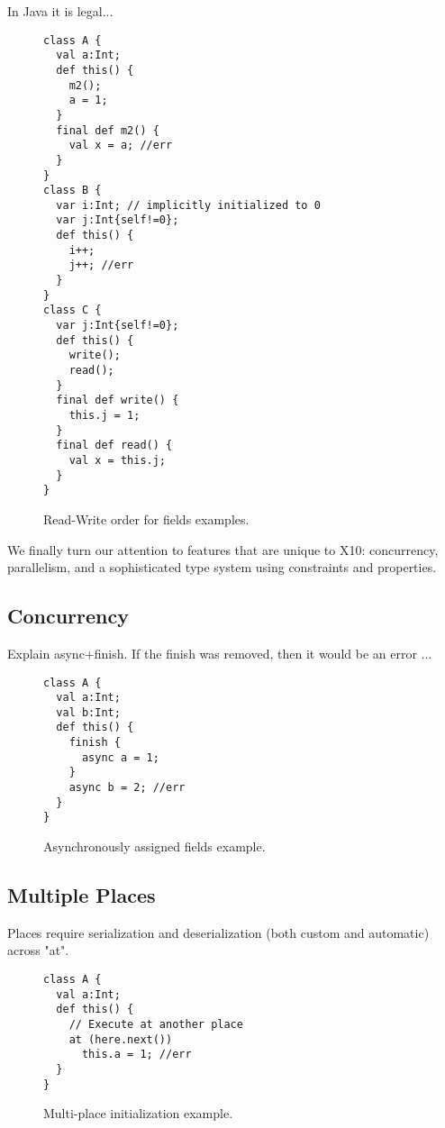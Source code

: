 In Java it is legal...

\begin{figure}
\begin{lstlisting}
class A {
  val a:Int;
  def this() {
    m2();
    a = 1;
  }
  final def m2() {
    val x = a; //err
  }
}
class B {
  var i:Int; // implicitly initialized to 0
  var j:Int{self!=0};
  def this() {
    i++;
    j++; //err
  }
}
class C {
  var j:Int{self!=0};
  def this() {
    write();
    read();
  }
  final def write() {
    this.j = 1;
  }
  final def read() {
    val x = this.j;
  }
}
\end{lstlisting}
\caption{Read-Write order for fields examples.
    }
\label{Figure:Read-Write-Order}
\end{figure}






We finally turn our attention to features that are unique to X10:
    concurrency, parallelism,
    and a sophisticated type system using constraints and properties.

\subsection{Concurrency}
Explain async+finish.
If the finish was removed, then it would be an error ...

\begin{figure}
\begin{lstlisting}
class A {
  val a:Int;
  val b:Int;
  def this() {
    finish {
      async a = 1;
    }
    async b = 2; //err
  }
}
\end{lstlisting}
\caption{Asynchronously assigned fields example.
    }
\label{Figure:Asynchronously-init}
\end{figure}


\subsection{Multiple Places}
Places require serialization and deserialization (both custom and automatic) across "at".

\begin{figure}
\begin{lstlisting}
class A {
  val a:Int;
  def this() {
    // Execute at another place
    at (here.next())
      this.a = 1; //err
  }
}
\end{lstlisting}
\caption{Multi-place initialization example.
    }
\label{Figure:Multi-place}
\end{figure}



